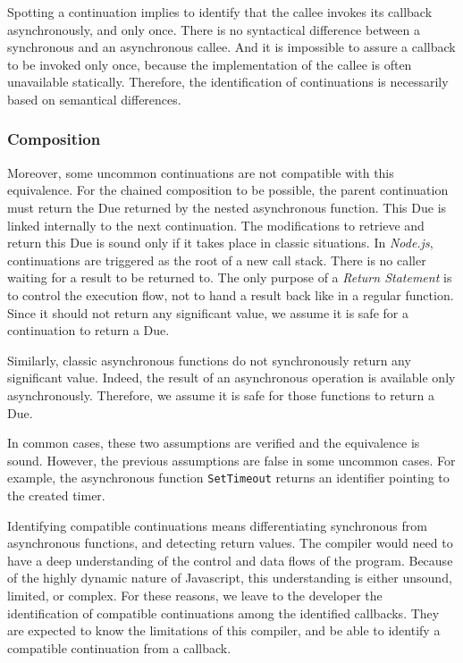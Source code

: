 Spotting a continuation implies to identify that the callee invokes its callback asynchronously, and only once.
There is no syntactical difference between a synchronous and an asynchronous callee.
And it is impossible to assure a callback to be invoked only once, because the implementation of the callee is often unavailable statically.
Therefore, the identification of continuations is necessarily based on semantical differences.

\subsubsection{Composition}

Moreover, some uncommon continuations are not compatible with this equivalence.
For the chained composition to be possible, the parent continuation must return the Due returned by the nested asynchronous function.
This Due is linked internally to the next continuation.
The modifications to retrieve and return this Due is sound only if it takes place in classic situations.
In \textit{Node.js}, continuations are triggered as the root of a new call stack.
There is no caller waiting for a result to be returned to.
The only purpose of a \textit{Return Statement} is to control the execution flow, not to hand a result back like in a regular function.
Since it should not return any significant value, we assume it is safe for a continuation to return a Due.

Similarly, classic asynchronous functions do not synchronously return any significant value.
Indeed, the result of an asynchronous operation is available only asynchronously.
Therefore, we assume it is safe for those functions to return a Due.

In common cases, these two assumptions are verified and the equivalence is sound.
However, the previous assumptions are false in some uncommon cases.
For example, the asynchronous function \texttt{SetTimeout} returns an identifier pointing to the created timer.

Identifying compatible continuations means differentiating synchronous from asynchronous functions, and detecting return values.
The compiler would need to have a deep understanding of the control and data flows of the program.
Because of the highly dynamic nature of Javascript, this understanding is either unsound, limited, or complex.
For these reasons, we leave to the developer the identification of compatible continuations among the identified callbacks.
They are expected to know the limitations of this compiler, and be able to identify a compatible continuation from a callback.

